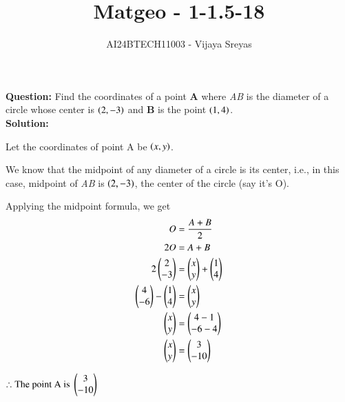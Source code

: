 \documentclass[journal]{IEEEtran}
\begin{document}
\onecolumn

\vspace{3cm}

\renewcommand{\thefigure}{\theenumi}
\renewcommand{\thetable}{\theenumi}
\renewcommand{\thefigure}{\arabic{figure}}
\renewcommand{\theequation}{1.\arabic{equation}}

\title{Matgeo - 1-1.5-18}
\author{AI24BTECH11003 - Vijaya Sreyas}
\maketitle

\textbf{Question: }Find the coordinates of a point \textbf{A} where \textit{AB} is the diameter of a circle whose center is $\left(2,-3\right)$ and \textbf{B} is the point $\left(1,4\right)$. \\

\textbf{Solution: }

Let the coordinates of point A be $\left(x, y\right)$.

We know that the midpoint of any diameter of a circle is its center, i.e., in this case, midpoint of \textit{AB} is $\left(2, -3\right)$, the center of the circle (say it's O).

Applying the midpoint formula, we get \\
\begin{align} O &= \frac{A+B}{2} \\
	2O &= A+B \\
	2 \begin{pmatrix}2 \\ -3\end{pmatrix} &= \begin{pmatrix}x \\ y\end{pmatrix} + \begin{pmatrix}1 \\ 4\end{pmatrix} \\
	\begin{pmatrix}4 \\ -6\end{pmatrix} - \begin{pmatrix}1 \\ 4\end{pmatrix} &= \begin{pmatrix}x \\ y\end{pmatrix} \\
	\begin{pmatrix}x \\ y\end{pmatrix} &= \begin{pmatrix}4-1 \\ -6-4\end{pmatrix} \\
	\begin{pmatrix}x \\ y\end{pmatrix} &= \begin{pmatrix}3 \\ -10\end{pmatrix}
\end{align}

$\therefore \text{The point A is } \begin{pmatrix}3 \\ -10\end{pmatrix}$ \\

\setcounter{figure}{0}
\end{document}
